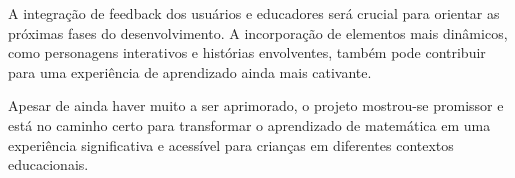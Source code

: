 A integração de feedback dos usuários e educadores será crucial para orientar as próximas fases do desenvolvimento. A incorporação de elementos mais dinâmicos, como personagens interativos e histórias envolventes, também pode contribuir para uma experiência de aprendizado ainda mais cativante.

Apesar de ainda haver muito a ser aprimorado, o projeto mostrou-se promissor e está no caminho certo para transformar o aprendizado de matemática em uma experiência significativa e acessível para crianças em diferentes contextos educacionais.


